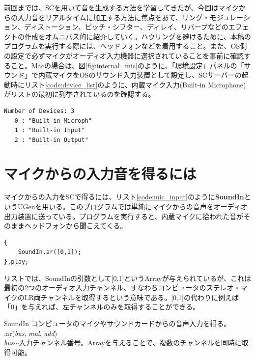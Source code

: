 \documentclass{jsarticle}
\begin{document}
\begin{figure}

\end{figure}
前回までは、SCを用いて音を生成する方法を学習してきたが、今回はマイクからの入力音をリアルタイムに加工する方法に焦点をあて、リング・モジュレーション、ディストーション、ピッチ・シフター、ディレイ、リバーブなどのエフェクトの作成をオムニバス的に紹介していく。ハウリングを避けるために、本稿のプログラムを実行する際には、ヘッドフォンなどを着用すること。また、OS側の設定で必ずマイクがオーディオ入力機器に選択されていることを事前に確認すること。Macの場合は、図\ref{fig:internal_mic}のように、「環境設定」パネルの「サウンド」で内蔵マイクをOSのサウンド入力装置として設定し、SCサーバーの起動時にリスト\ref{code:device_list}のように、内蔵マイク入力(Built-in Microphone)がリストの最初に列挙されているのを確認する。

\begin{lstlisting}[caption=入出力デバイスのリスト,label=code:device_list]
Number of Devices: 3
   0 : "Built-in Microph"
   1 : "Built-in Input"
   2 : "Built-in Output"
\end{lstlisting}

\section{マイクからの入力音を得るには}
マイクからの入力をSCで得るには、リスト\ref{code:mic_input}のように{\bf SoundIn}というUGenを用いる。このプログラムでは単純にマイクからの音声をオーディオ出力装置に送っている。プログラムを実行すると、内蔵マイクに拾われた音がそのままヘッドフォンから聞こえてくる。

\begin{lstlisting}[caption=マイク入力,label=code:mic_input]
{
	SoundIn.ar([0,1]);
}.play;
\end{lstlisting}

リストでは、SoundInの引数として[0,1]というArrayが与えられているが、これは最初の2つのオーディオ入力チャンネル、すなわちコンピュータのステレオ・マイクのLR両チャンネルを取得するという意味である。[0,1]の代わりに例えば「0」を与えれば、左チャンネルのみを取得することができる。

\begin{itembox}[l]{SoundIn}
{\footnotesize 
コンピュータのマイクやサウンドカードからの音声入力を得る。\\
.ar({\it bus}, {\it mul}, {\it add})\\
{\it bus}$\cdots$入力チャンネル番号。Arrayを与えることで、複数のチャンネルを同時に取得可能。\\
}
\end{itembox}
\end{document}
